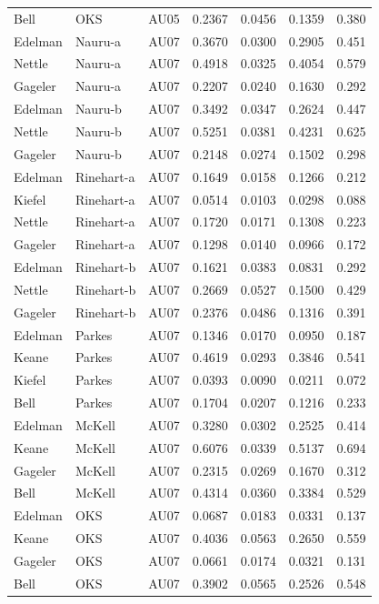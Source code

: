 \documentclass{monashthesis}
\begin{document}
\begin{center}
\begin{longtable}{lllllll}
Bell & OKS & AU05 & 0.2367 & 0.0456 & 0.1359 & 0.380 \\
Edelman & Nauru-a & AU07 & 0.3670 & 0.0300 & 0.2905 & 0.451 \\
Nettle & Nauru-a & AU07 & 0.4918 & 0.0325 & 0.4054 & 0.579 \\
Gageler & Nauru-a & AU07 & 0.2207 & 0.0240 & 0.1630 & 0.292 \\
Edelman & Nauru-b & AU07 & 0.3492 & 0.0347 & 0.2624 & 0.447 \\
Nettle & Nauru-b & AU07 & 0.5251 & 0.0381 & 0.4231 & 0.625 \\
Gageler & Nauru-b & AU07 & 0.2148 & 0.0274 & 0.1502 & 0.298 \\
Edelman & Rinehart-a & AU07 & 0.1649 & 0.0158 & 0.1266 & 0.212 \\
Kiefel & Rinehart-a & AU07 & 0.0514 & 0.0103 & 0.0298 & 0.088 \\
Nettle & Rinehart-a & AU07 & 0.1720 & 0.0171 & 0.1308 & 0.223 \\
Gageler & Rinehart-a & AU07 & 0.1298 & 0.0140 & 0.0966 & 0.172 \\
Edelman & Rinehart-b & AU07 & 0.1621 & 0.0383 & 0.0831 & 0.292 \\
Nettle & Rinehart-b & AU07 & 0.2669 & 0.0527 & 0.1500 & 0.429 \\
Gageler & Rinehart-b & AU07 & 0.2376 & 0.0486 & 0.1316 & 0.391 \\
Edelman & Parkes & AU07 & 0.1346 & 0.0170 & 0.0950 & 0.187 \\
Keane & Parkes & AU07 & 0.4619 & 0.0293 & 0.3846 & 0.541 \\
Kiefel & Parkes & AU07 & 0.0393 & 0.0090 & 0.0211 & 0.072 \\
Bell & Parkes & AU07 & 0.1704 & 0.0207 & 0.1216 & 0.233 \\
Edelman & McKell & AU07 & 0.3280 & 0.0302 & 0.2525 & 0.414 \\
Keane & McKell & AU07 & 0.6076 & 0.0339 & 0.5137 & 0.694 \\
Gageler & McKell & AU07 & 0.2315 & 0.0269 & 0.1670 & 0.312 \\
Bell & McKell & AU07 & 0.4314 & 0.0360 & 0.3384 & 0.529 \\
Edelman & OKS & AU07 & 0.0687 & 0.0183 & 0.0331 & 0.137 \\
Keane & OKS & AU07 & 0.4036 & 0.0563 & 0.2650 & 0.559 \\
Gageler & OKS & AU07 & 0.0661 & 0.0174 & 0.0321 & 0.131 \\
Bell & OKS & AU07 & 0.3902 & 0.0565 & 0.2526 & 0.548 \\

\end{longtable}
\end{center}
\end{document}
